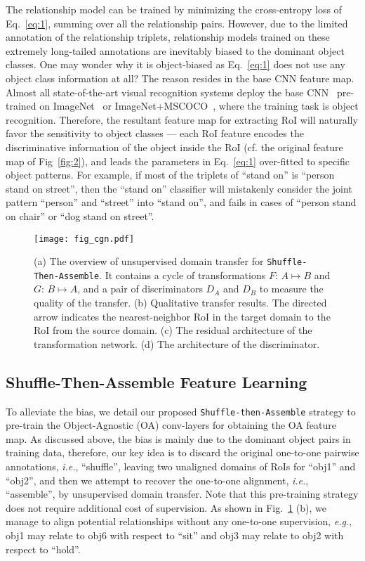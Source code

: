 \documentclass[runningheads]{llncs}
\newcommand{\eg}{\textit{e.g.}}
\newcommand{\ie}{\textit{i.e.}}
\begin{document}
The relationship model can be trained by minimizing the cross-entropy loss of Eq.~\eqref{eq:1}, summing over all the relationship pairs. However, due to the limited annotation of the relationship triplets, relationship models trained on these extremely long-tailed annotations are inevitably biased to the dominant object classes. One may wonder why it is object-biased as Eq.~\eqref{eq:1} does not use any object class information at all? The reason resides in the base CNN feature map. Almost all state-of-the-art visual recognition systems deploy the base CNN~\cite{szegedy2017inception,simonyan2014very,he2016deep} pre-trained on ImageNet~\cite{deng2009imagenet} or ImageNet+MSCOCO~\cite{lin2014microsoft}, where the training task is object recognition. Therefore, the resultant feature map for extracting RoI will naturally favor the sensitivity to object classes --- each RoI feature encodes the discriminative information of the object inside the RoI (cf. the original feature map of Fig~\ref{fig:2}), and leads the parameters in Eq.~\eqref{eq:1} over-fitted to specific object patterns. For example, if most of the triplets of ``stand on'' is ``person stand on street'', then the ``stand on'' classifier will mistakenly consider the joint pattern ``person'' and ``street'' into ``stand on'', and fails in cases of ``person stand on chair'' or ``dog stand on street''.


\begin{figure}[t!]
\centering
\texttt{[image: fig\_cgn.pdf]}
\caption{(a) The overview of unsupervised domain transfer for \texttt{Shuffle-Then-Assemble}. It contains a cycle of transformations $F$: $A\mapsto B$ and $G$: $B\mapsto A$, and a pair of discriminators $D_A$ and $D_B$ to measure the quality of the transfer. (b) Qualitative transfer results. The directed arrow indicates the nearest-neighbor RoI in the target domain to the RoI from the source domain. (c) The residual architecture of the transformation network. (d) The architecture of the discriminator.
}
\label{fig:3}
\end{figure}



\subsection{Shuffle-Then-Assemble Feature Learning}
To alleviate the bias, we detail our proposed \texttt{Shuffle-then-Assemble} strategy to pre-train the Object-Agnostic (OA) conv-layers for obtaining the OA feature map. As discussed above, the bias is mainly due to the dominant object pairs in training data, therefore, our key idea is to discard the original one-to-one pairwise annotations, \ie, ``shuffle'', leaving two unaligned domains of RoIs for ``obj1'' and ``obj2'', and then we attempt to recover the one-to-one alignment, \ie, ``assemble'', by unsupervised domain transfer. Note that this pre-training strategy does not require additional cost of supervision. As shown in Fig.~\ref{fig:3} (b), we manage to align potential relationships without any one-to-one supervision, \eg, obj1 may relate to obj6 with respect to ``sit'' and obj3 may relate to obj2 with respect to ``hold''.
\end{document}
